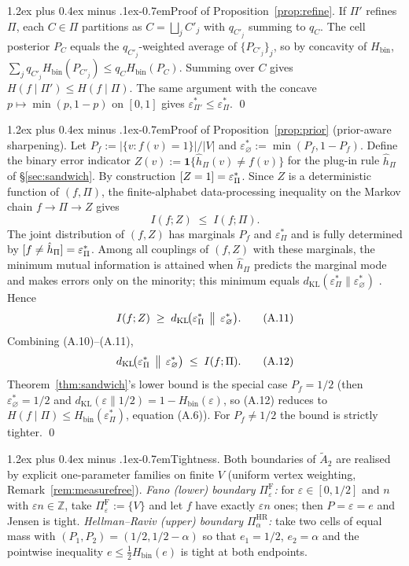 \documentclass[10pt]{article}
\makeatletter
\def\paragraph{\@startsection{paragraph}{4}{\z@}%
  {1.2ex plus 0.4ex minus .1ex}{-0.7em}{\normalsize\bf}}
\theoremstyle{definition}
\theoremstyle{remark}
\newcommand{\Hbin}{H_{\mathrm{bin}}}
\newcommand{\eps}{\varepsilon}
\newcommand{\epsP}{\eps^{*}_{\Pi}}
\newcommand{\epsE}{\eps^{*}_{\varnothing}}
\let\Pr\relax
\DeclareMathOperator{\Pr}{\mathbb{P}}
\newcommand{\dKL}{d_{\mathrm{KL}}}
\makeatother
\begin{document}
\paragraph{Proof of Proposition~\ref{prop:refine}.} If $\Pi'$ refines
$\Pi$, each $C \in \Pi$ partitions as
$C = \bigsqcup_j C'_j$ with $q_{C'_j}$ summing to $q_C$. The cell
posterior $P_C$ equals the $q_{C'_j}$-weighted average of $\{P_{C'_j}\}_j$,
so by concavity of $\Hbin$,
$\sum_j q_{C'_j} \Hbin(P_{C'_j}) \le q_C \Hbin(P_C)$. Summing over
$C$ gives $H(f \mid \Pi') \le H(f \mid \Pi)$. The same argument
with the concave $p \mapsto \min(p, 1-p)$ on $[0,1]$ gives
$\eps^{*}_{\Pi'} \le \epsP$. \qed

\paragraph{Proof of Proposition~\ref{prop:prior} (prior-aware sharpening).}
Let $P_f := |\{v : f(v) = 1\}| / |V|$ and
$\epsE := \min(P_f, 1 - P_f)$. Define the binary error indicator
$Z(v) := \mathbf{1}\{\hat{h}_\Pi(v) \neq f(v)\}$ for the plug-in
rule $\hat{h}_\Pi$ of \S\ref{sec:sandwich}. By construction
$\Pr[Z = 1] = \epsP$. Since $Z$ is a deterministic function of
$(f, \Pi)$, the finite-alphabet data-processing inequality
\citep[Thm 2.8.1, specialised to discrete distributions --- no
measure-theoretic generality needed]{cover2006eit} on the Markov
chain $f \to \Pi \to Z$ gives
\[
  I(f ; Z) \;\le\; I(f ; \Pi).
  \tag{A.10}
\]
The joint distribution of $(f, Z)$ has marginals $P_f$ and $\epsP$
and is fully determined by $\Pr[f \neq \hat{h}_\Pi] = \epsP$. Among
all couplings of $(f, Z)$ with these marginals, the minimum mutual
information is attained when $\hat{h}_\Pi$ predicts the marginal
mode and makes errors only on the minority; this minimum equals
$\dKL(\epsP \| \epsE)$ \citep[eq.\ (6)]{hanverdu1994}. Hence
\[
  I(f ; Z) \;\ge\; \dKL\!\bigl(\epsP \,\bigm\|\, \epsE\bigr).
  \tag{A.11}
\]
Combining (A.10)--(A.11),
\[
  \dKL\!\bigl(\epsP \,\bigm\|\, \epsE\bigr) \;\le\; I(f ; \Pi).
  \tag{A.12}
\]
Theorem~\ref{thm:sandwich}'s lower bound is the special case
$P_f = 1/2$ (then $\epsE = 1/2$ and
$\dKL(\eps \| 1/2) = 1 - \Hbin(\eps)$, so (A.12) reduces to
$H(f \mid \Pi) \le \Hbin(\epsP)$, equation (A.6)). For $P_f \neq 1/2$
the bound is strictly tighter. \qed

\paragraph{Tightness.} Both boundaries of $\widetilde{A}_2$ are
realised by explicit one-parameter families on finite $V$ (uniform
vertex weighting, Remark~\ref{rem:measurefree}).
\emph{Fano (lower) boundary $\Pi_\eps^{\mathrm{F}}$:} for
$\eps \in [0, 1/2]$ and $n$ with $\eps n \in \mathbb{Z}$, take
$\Pi_\eps^{\mathrm{F}} := \{V\}$ and let $f$ have exactly $\eps n$
ones; then $P = \eps = e$ and Jensen is tight.
\emph{Hellman--Raviv (upper) boundary $\Pi_\alpha^{\mathrm{HR}}$:}
take two cells of equal mass with $(P_1, P_2) = (1/2, 1/2 - \alpha)$
so that $e_1 = 1/2$, $e_2 = \alpha$ and the pointwise inequality
$e \le \tfrac{1}{2}\Hbin(e)$ is tight at both endpoints.
\end{document}
